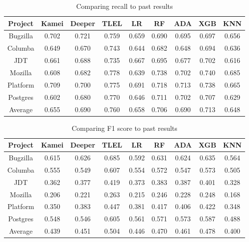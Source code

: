 \documentclass[../main.tex]{subfiles}
\begin{document}
\begin{table}[H] 
\centering 
\caption{Comparing recall to past results} 
\begin{tabular}{|c c c c c c c c c|} 
\hline 
Project  & Kamei & Deeper & TLEL  & LR    & RF    & ADA   & XGB  & KNN\\ 
\hline \hline 
Bugzilla & 0.702 & 0.721  & 0.759 & 0.659 & 0.690 & 0.695 &0.697  & 0.656\\ 
\hline 
Columba  & 0.649 & 0.670  & 0.743 & 0.644 & 0.682 & 0.648 &0.694  & 0.636\\ 
\hline 
JDT      & 0.661 & 0.688  & 0.735 & 0.667 & 0.695 & 0.677 & 0.702  & 0.616\\ 
\hline 
Mozilla  & 0.608 & 0.682  & 0.778 & 0.639 & 0.738 &0.702  &0.740  & 0.685\\ 
\hline 
Platform & 0.709 & 0.700  & 0.775 & 0.691 & 0.718 & 0.713 & 0.738  & 0.665\\ 
\hline 
Postgres & 0.602 & 0.680  & 0.770 & 0.646 & 0.711 & 0.702 &0.707  & 0.629\\ 
\hline 
Average  & 0.655 & 0.690  & 0.760 & 0.658 & 0.706 & 0.690 & 0.713  & 0.648\\ 
\hline 
\end{tabular} 
\label{table:rq1_Recall} 
\end{table} 

\begin{table}[H] 
\centering 
\caption{Comparing F1 score to past results} 
\begin{tabular}{|c c c c c c c c c|} 
\hline 
Project  & Kamei & Deeper& TLEL  & LR    & RF   & ADA & XGB & KNN\\ 
\hline \hline 
Bugzilla & 0.615 & 0.626 & 0.685 & 0.592 &0.631 & 0.624 &0.635 & 0.564\\ 
\hline 
Columba  & 0.555 & 0.549 & 0.607 & 0.554 &0.572 & 0.547 &0.573&0.505\\ 
\hline 
JDT      & 0.362 & 0.377 & 0.419 & 0.373 &0.383 & 0.387 &0.401 &0.328\\ 
\hline 
Mozilla  & 0.206 & 0.221 & 0.263 & 0.215 &0.246 & 0.228 &0.248&0.168\\ 
\hline 
Platform & 0.350 & 0.383 & 0.447 & 0.381 &0.417 & 0.406 &0.422&0.348\\ 
\hline 
Postgres & 0.548 & 0.546 & 0.605 & 0.561 &0.571 & 0.573 &0.587&0.488\\ 
\hline 
Average  & 0.439 & 0.451 & 0.504 & 0.446 &0.470 & 0.461  &0.478 & 0.400\\ 
\hline 
\end{tabular} 
\label{table:rq1_F1} 
\end{table} 
\end{document}

